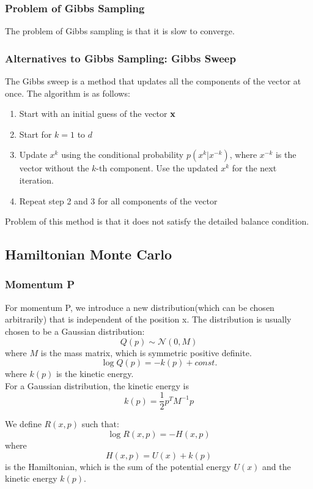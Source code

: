 \documentclass[12pt,a4paper]{article}
\begin{document}
\subsubsection{Problem of Gibbs Sampling}
The problem of Gibbs sampling is that it is slow to converge.

\subsubsection{Alternatives to Gibbs Sampling: Gibbs Sweep}
The Gibbs sweep is a method that updates all the components of the vector at once. The algorithm is as follows:
\begin{enumerate}
    \item Start with an initial guess of the vector $\vb{x}$
    \item Start for $k = 1$ to $d$
    \item Update $x^k$ using the conditional probability $p(x^k|x^{-k})$, where $x^{-k}$ is the vector without the $k$-th component. Use the updated $x^k$ for the next iteration.
    \item Repeat step 2 and 3 for all components of the vector
\end{enumerate}
Problem of this method is that it does not satisfy the detailed balance condition.\\

\subsection{Hamiltonian Monte Carlo}

\subsubsection{Momentum P}
For momentum P, we introduce a new distribution(which can be chosen arbitrarily) that is independent of the position x. The distribution is usually chosen to be a Gaussian distribution:
$$
    Q(p) \sim \mathcal{N}(0,M)
$$
where $M$ is the mass matrix, which is symmetric positive definite.\\
$$
    \log Q(p) = - k(p) + const.
$$
where $k(p)$ is the kinetic energy.\\
For a Gaussian distribution, the kinetic energy is
$$
    k(p) = \frac{1}{2}p^TM^{-1}p
$$


We define $R(x,p)$ such that:
$$
    \log R(x,p) = -H(x,p)
$$
where
$$
    H(x,p) = U(x) + k(p)
$$
is the Hamiltonian, which is the sum of the potential energy $U(x)$ and the kinetic energy $k(p)$.\\
\end{document}
